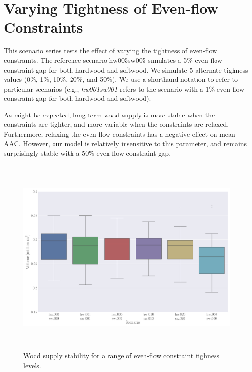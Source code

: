 


\section{Varying Tightness of Even-flow Constraints}
\label{sec:scenario_series_5}

This scenario series tests the effect of varying the tightness of even-flow constraints. The reference scenario hw005sw005 simulates a 5\% even-flow constraint gap for both hardwood and softwood. We simulate 5 alternate tighness values (0\%, 1\%, 10\%, 20\%, and 50\%). 
We use a shorthand notation to refer to particular scenarios (e.g., \emph{hw001sw001} refers to the scenario with a 1\% even-flow constraint gap for both hardwood and softwood).

As might be expected, long-term wood supply is more stable when the constraints are tighter, and more variable when the constraints are relaxed. Furthermore, relaxing the even-flow constraints has a negative effect on mean AAC. However, our model is relatively insensitive to this parameter, and remains surprisingly stable with a 50\% even-flow constraint gap. 

\begin{figure}[H]
  \centering
  \includegraphics[height=10cm]{images/boxplots_series5}
  \caption{Wood supply stability for a range of even-flow constraint tighness levels. }
  \label{fig:scenario_series_5}
\end{figure}

